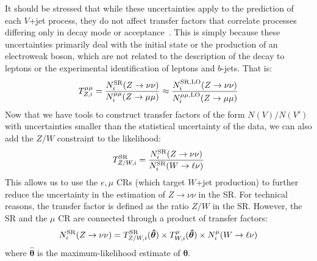 It should be stressed that while these uncertainties apply to the prediction of each $V$+jet process, they do not affect transfer factors that correlate processes differing only in decay mode or acceptance~\cite{ewk3,monojet}.
This is simply because these uncertainties primarily deal with the initial state or the production of an electroweak boson, which are not related to the description of the decay to leptons or the experimental identification of leptons and $b$-jets.
That is:
\begin{equation}
    {T}^{\mu\mu}_{Z,i} = \frac{N^\mathrm{SR}_i(Z\rightarrow\nu\nu)}{N_i^{\mu\mu}(Z\rightarrow\mu\mu)} \approx \frac{N^\mathrm{SR,LO}_i(Z\rightarrow\nu\nu)}{N_i^{\mu\mu,\mathrm{LO}}(Z\rightarrow\mu\mu)}
\end{equation}
Now that we have tools to construct transfer factors of the form $N(V)/N(V')$ with uncertainties smaller than the statistical uncertainty of the data, we can also add the $Z/W$ constraint to the likelihood:
\begin{equation}
    {T}^{\mathrm{SR}}_{Z/W,i} = \frac{N^\mathrm{SR}_i(Z\rightarrow\nu\nu)}{N_i^\mathrm{SR}(W\rightarrow\ell\nu)}
\end{equation}
This allows us to use the $e,\mu$ CRs (which target $W$+jet production) to further reduce the uncertainty in the estimation of $Z\rightarrow\nu\nu$ in the SR.
For technical reasons, the transfer factor is defined as the ratio $Z/W$ in the SR.
However, the SR and the $\mu$ CR are connected through a product of transfer factors:
\begin{equation}
    N^\mathrm{SR}_i(Z\rightarrow\nu\nu) = {T}^{\mathrm{SR}}_{Z/W,i}(\bm{\hat\theta}) \times {T}^{\mu}_{W,i}(\bm{\hat\theta}) \times N^\mu_i(W\rightarrow\ell\nu)
\end{equation}
where $\bm{\hat\theta}$ is the maximum-likelihood estimate of $\bm\theta$.

